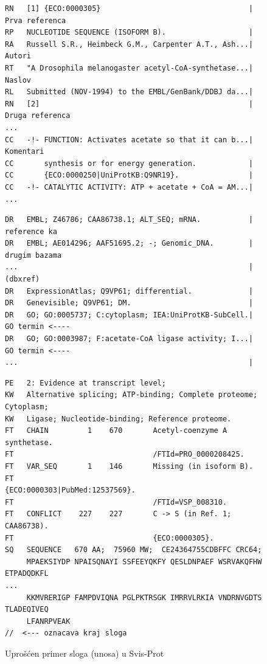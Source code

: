 \begin{figure}[h!]
\begin{lstlisting}[firstnumber=7,   basicstyle=\footnotesize\ttfamily\color{gray}]
RN   [1] {ECO:0000305}                                  | Prva referenca
RP   NUCLEOTIDE SEQUENCE (ISOFORM B).                   | 
RA   Russell S.R., Heimbeck G.M., Carpenter A.T., Ash...| Autori
RT   "A Drosophila melanogaster acetyl-CoA-synthetase...| Naslov
RL   Submitted (NOV-1994) to the EMBL/GenBank/DDBJ da...|
RN   [2]                                                | Druga referenca              
...                                                     
CC   -!- FUNCTION: Activates acetate so that it can b...| Komentari
CC       synthesis or for energy generation.            |
CC       {ECO:0000250|UniProtKB:Q9NR19}.                |
CC   -!- CATALYTIC ACTIVITY: ATP + acetate + CoA = AM...|
...                                                     
\end{lstlisting}
\begin{lstlisting}[firstnumber=30]
DR   EMBL; Z46786; CAA86738.1; ALT_SEQ; mRNA.           | reference ka
DR   EMBL; AE014296; AAF51695.2; -; Genomic_DNA.        | drugim bazama 
...                                                     | (dbxref)
DR   ExpressionAtlas; Q9VP61; differential.             |
DR   Genevisible; Q9VP61; DM.                           |
DR   GO; GO:0005737; C:cytoplasm; IEA:UniProtKB-SubCell.| GO termin <----
DR   GO; GO:0003987; F:acetate-CoA ligase activity; I...| GO termin <----
...                                                     |
\end{lstlisting}
\begin{lstlisting}[firstnumber=38]
PE   2: Evidence at transcript level;
KW   Alternative splicing; ATP-binding; Complete proteome; Cytoplasm; 
KW   Ligase; Nucleotide-binding; Reference proteome.                  
FT   CHAIN         1    670       Acetyl-coenzyme A synthetase.
FT                                /FTId=PRO_0000208425.
FT   VAR_SEQ       1    146       Missing (in isoform B).
FT                                {ECO:0000303|PubMed:12537569}.
FT                                /FTId=VSP_008310.
FT   CONFLICT    227    227       C -> S (in Ref. 1; CAA86738).
FT                                {ECO:0000305}.
SQ   SEQUENCE   670 AA;  75960 MW;  CE24364755CDBFFC CRC64;
     MPAEKSIYDP NPAISQNAYI SSFEEYQKFY QESLDNPAEF WSRVAKQFHW ETPADQDKFL
...
     KKMVRERIGP FAMPDVIQNA PGLPKTRSGK IMRRVLRKIA VNDRNVGDTS TLADEQIVEQ
     LFANRPVEAK
//  <--- oznacava kraj sloga
\end{lstlisting}
\caption{Uprošćen primer sloga (unosa) u Svis-Prot}
\end{figure}



